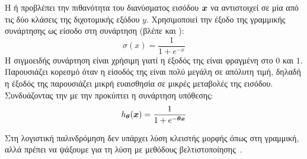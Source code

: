 Η   ή
προβλέπει την πιθανότητα του διανύσματος εισόδου $\vx$ να αντιστοιχεί σε μία από τις δύο κλάσεις της διχοτομικής εξόδου $y$.
Χρησιμοποιεί την έξοδο της γραμμικής συνάρτησης ως είσοδο στη
 συνάρτηση (βλέπε και ):
\begin{equation}
    \label{eq:sigmoid}
    \sigma(x) = \frac{1}{1 + e^{-x}}
\end{equation}
Η σιγμοειδής συνάρτηση είναι χρήσιμη γιατί η έξοδός της είναι φραγμένη στο $0$ και $1$.
Παρουσιάζει κορεσμό όταν η είσοδός της είναι πολύ μεγάλη σε απόλυτη τιμή, δηλαδή η έξοδός της παρουσιάζει μικρή ευαισθησία σε μικρές μεταβολές της εισόδου.
Συνδυάζοντας την  με την  προκύπτει η συνάρτηση υπόθεσης:
\begin{equation}
    \label{eq:logistic-regression}
    \hth(\vx) = \frac{1}{1 + e^{-\vth \vx}}
\end{equation}

Στη λογιστική παλινδρόμηση δεν υπάρχει λύση κλειστής μορφής όπως στη γραμμική, αλλά πρέπει να ψάξουμε για τη λύση με μεθόδους βελτιστοποίησης~\cite{goodfellow}.

